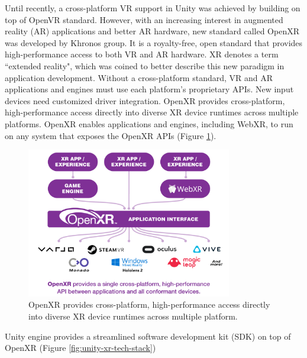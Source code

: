 Until recently, a cross-platform VR support in Unity was achieved by building on top of OpenVR standard. However, with an increasing interest in augmented reality (AR) applications and better AR hardware, new standard called OpenXR was developed by Khronos group. It is a royalty-free, open standard that provides high-performance access to both VR and AR hardware. XR denotes a term ``extended reality", which was coined to better describe this new paradigm in application development. Without a cross-platform standard, VR and AR applications and engines must use each platform’s proprietary APIs. New input devices need customized driver integration. OpenXR provides cross-platform, high-performance access directly into diverse XR device runtimes across multiple platforms. OpenXR enables applications and engines, including WebXR, to run on any system that exposes the OpenXR APIs (Figure \ref{fig:openxr-solves-fragmentation}).

\begin{figure}[!ht]
	\centering
	\includegraphics[width=0.8\textwidth]{figures/openxr-solves-fragmentation.png}
	\caption{OpenXR provides cross-platform, high-performance access directly into diverse XR device runtimes across multiple platform.}
	\label{fig:openxr-solves-fragmentation}
\end{figure}

Unity engine provides a streamlined software development kit (SDK) on top of OpenXR (Figure \ref{fig:unity-xr-tech-stack})

